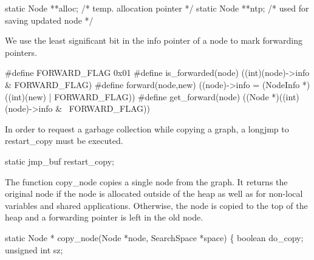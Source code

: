 \nwenddocs{}\plusendmoddef\nwstartdeflinemarkup{}\nwenddeflinemarkup
static Node **alloc;                    /* temp. allocation pointer */
static Node **ntp;                      /* used for saving updated node */

\nwendcode{}\nwdocspar
We use the least significant bit in the info pointer of a node to mark
forwarding pointers.

\nwenddocs{}\plusendmoddef\nwstartdeflinemarkup{}\nwenddeflinemarkup
#define FORWARD_FLAG            0x01
#define is_forwarded(node)      ((int)(node)->info & FORWARD_FLAG)
#define forward(node,new)       ((node)->info = (NodeInfo *)((int)(new) | FORWARD_FLAG))
#define get_forward(node)       ((Node *)((int)(node)->info & ~FORWARD_FLAG))

\nwendcode{}\nwdocspar
In order to request a garbage collection while copying a graph, a
{\Tt{}longjmp\nwendquote} to {\Tt{}restart{\_}copy\nwendquote} must be executed.

\nwenddocs{}\plusendmoddef\nwstartdeflinemarkup{}\nwenddeflinemarkup
static jmp_buf restart_copy;

\nwendcode{}\nwdocspar
The function {\Tt{}copy{\_}node\nwendquote} copies a single node from the graph. It
returns the original node if the node is allocated outside of the heap
as well as for non-local variables and shared applications. Otherwise,
the node is copied to the top of the heap and a forwarding pointer is
left in the old node.

\nwenddocs{}\plusendmoddef\nwstartdeflinemarkup{}\nwenddeflinemarkup
static Node *
copy_node(Node *node, SearchSpace *space)
\{
    boolean      do_copy;
    unsigned int sz;

